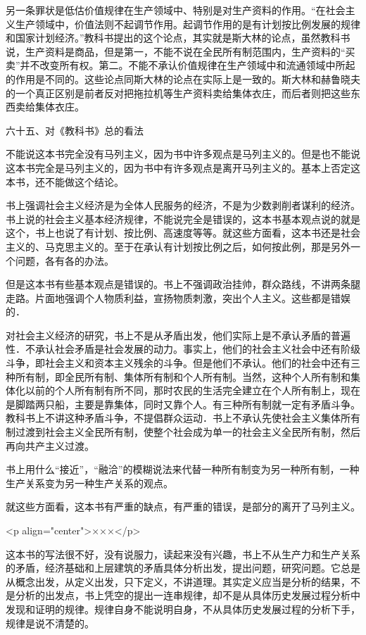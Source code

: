 另一条罪状是低估价值规律在生产领域中、特别是对生产资料的作用。“在社会主义生产领域中，价值法则不起调节作用。起调节作用的是有计划按比例发展的规律和国家计划经济。”教科书提出的这个论点，其实就是斯大林的论点，虽然教科书说，生产资料是商品，但是第一，不能不说在全民所有制范围内，生产资料的“买卖”并不改变所有权。第二。不能不承认价值规律在生产领域中和流通领域中所起的作用是不同的。这些论点同斯大林的论点在实际上是一致的。斯大林和赫鲁晓夫的一个真正区别是前者反对把拖拉机等生产资料卖给集体衣庄，而后者则把这些东西卖给集体衣庄。

六十五、对《教科书》总的看法

不能说这本书完全没有马列主义，因为书中许多观点是马列主义的。但是也不能说这本书完全是马列主义的，因为书中有许多观点是离开马列主义的。基本上否定这本书，还不能做这个结论。

书上强调社会主义经济是为全体人民服务的经济，不是为少数剥削者谋利的经济。书上说的社会主义基本经济规律，不能说完全是错误的，这本书基本观点说的就是这个，书上也说了有计划、按比例、高速度等等。就这些方面看，这本书还是社会主义的、马克思主义的。至于在承认有计划按比例之后，如何按此例，那是另外一个问题，各有各的办法。

但是这本书有些基本观点是错误的。书上不强调政治挂帅，群众路线，不讲两条腿走路。片面地强调个人物质利益，宣扬物质刺激，突出个人主义。这些都是错娱的．

对社会主义经济的研究，书上不是从矛盾出发，他们实际上是不承认矛盾的普遍性．不承认社会矛盾是社会发展的动力。事实上，他们的社会主义社会中还有阶级斗争，即社会主义和资本主义残余的斗争。但是他们不承认。他们的社会中还有三种所有制，即全民所有制、集体所有制和个人所有制。当然，这种个人所有制和集体化以前的个人所有制有所不同，那时农民的生活完全建立在个人所有制上，现在是脚踏两只船，主要是靠集体，同时又靠个人。有三种所有制就一定有矛盾斗争。教科书上不讲这种矛盾斗争，不提倡群众运动．书上不承认先使社会主义集体所有制过渡到社会主义全民所有制，使整个社会成为单一的社会主义全民所有制，然后再向共产主义过渡。

书上用什么“接近”，“融洽”的模糊说法来代替一种所有制变为另一种所有制，一种生产关系变为另一种生产关系的观点。

就这些方面看，这本书有严重的缺点，有严重的错误，是部分的离开了马列主义。

<p align="center">×××</p>

这本书的写法很不好，没有说服力，读起来没有兴趣，书上不从生产力和生产关系的矛盾，经济基础和上层建筑的矛盾具体分析出发，提出问题，研究问题。它总是从概念出发，从定义出发，只下定义，不讲道理。其实定义应当是分析的结果，不是分析的出发点，书上凭空的提出一连串规律，却不是从具体历史发展过程分析中发现和证明的规律。规律自身不能说明自身，不从具体历史发展过程的分析下手，规律是说不清楚的。

